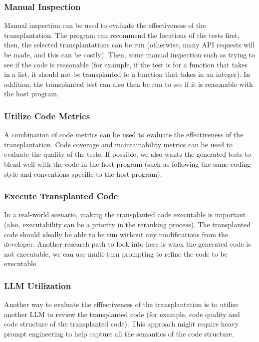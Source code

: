 \documentclass[sigconf]{acmart}
\begin{document}
\subsubsection{Manual Inspection}\label{sec:manual-inspection}
Manual inspection can be used to evaluate the effectiveness of the transplantation. The program can recommend the locations of the tests first, then, the selected transplantations can be run (otherwise, many API requests will be made, and this can be costly). Then, some manual inspection such as trying to see if the code is reasonable (for example, if the test is for a function that takes in a list, it should not be transplanted to a function that takes in an integer). In addition, the transplanted test can also then be run to see if it is reasonable with the host program.

\subsubsection{Utilize Code Metrics}\label{sec:utilize-code-metrics}
A combination of code metrics can be used to evaluate the effectiveness of the transplantation. Code coverage and maintainability metrics can be used to evaluate the quality of the tests. If possible, we also wants the generated tests to blend well with the code in the host program (such as following the same coding style and conventions specific to the host program).

\subsubsection{Execute Transplanted Code}\label{sec:execute-transplanted-code}
In a real-world scenario, making the transplanted code executable is important (also, executability can be a priority in the reranking process). The transplanted code should ideally be able to be run without any modifications from the developer. Another research path to look into here is when the generated code is not executable, we can use multi-turn prompting to refine the code to be executable.

\subsubsection{LLM Utilization}\label{sec:llm-utilization}
Another way to evaluate the efffectiveness of the transplantation is to utilize another LLM to review the transplanted code (for example, code quality and code structure of the transplanted code). This approach might require heavy prompt engineering to help capture all the semantics of the code structure.
\end{document}
